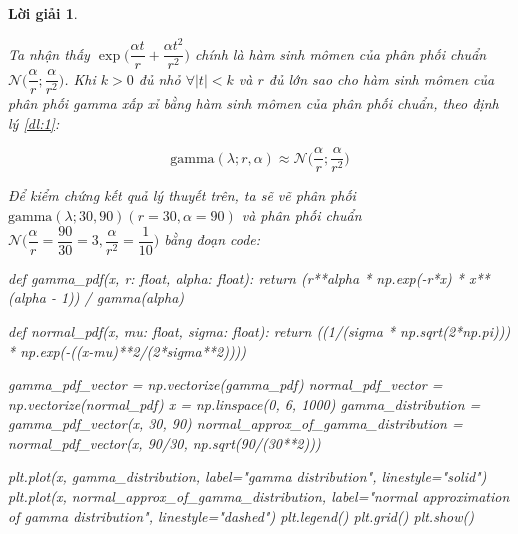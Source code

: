 \documentclass[14pt, a4paper]{article}
\theoremstyle{sltheorem}
\theoremstyle{soltheorem}
\newtheorem*{loigiai}{Lời giải}
\begin{document}
\begin{loigiai}
\begin{enumerate}
        Ta nhận thấy $\exp\Bigg( \dfrac{\alpha t}{r} + \dfrac{\alpha t^2}{r^2}\Bigg)$ chính là hàm sinh mômen của phân phối chuẩn $\mathcal{N}\Big(\dfrac{\alpha}{r}; \dfrac{\alpha}{r^2} \Big)$.
        Khi $k > 0$ đủ nhỏ $\forall \lvert t \rvert <k$ và $r$ đủ lớn sao cho hàm sinh mômen của phân phối gamma xấp xỉ bằng hàm sinh mômen của phân phối chuẩn, theo định lý \ref{dl:1}:

        \begin{equation*}
            \text{gamma}(\lambda; r, \alpha) \approx \mathcal{N}\Big(\dfrac{\alpha}{r};\dfrac{\alpha}{r^2}\Big)
        \end{equation*}

        Để kiểm chứng kết quả lý thuyết trên, ta sẽ vẽ phân phối $\text{gamma}(\lambda; 30, 90) (r=30, \alpha=90)$ và phân phối chuẩn $\mathcal{N}\Big(\dfrac{\alpha}{r}=\dfrac{90}{30}=3, \dfrac{\alpha}{r^2}=\dfrac{1}{10}\Big)$ bằng đoạn code:

        \begin{python}
def gamma_pdf(x, r: float, alpha: float):
    return (r**alpha * np.exp(-r*x) * x**(alpha - 1)) / gamma(alpha)


def normal_pdf(x, mu: float, sigma: float):
    return ((1/(sigma * np.sqrt(2*np.pi))) * np.exp(-((x-mu)**2/(2*sigma**2))))

gamma_pdf_vector = np.vectorize(gamma_pdf)
normal_pdf_vector = np.vectorize(normal_pdf)
x = np.linspace(0, 6, 1000)
gamma_distribution = gamma_pdf_vector(x, 30, 90)
normal_approx_of_gamma_distribution = normal_pdf_vector(x, 90/30, np.sqrt(90/(30**2)))
            
plt.plot(x, gamma_distribution, label="gamma distribution", linestyle="solid")
plt.plot(x, normal_approx_of_gamma_distribution, label="normal approximation of gamma distribution", linestyle="dashed")
plt.legend()
plt.grid()
plt.show()
        \end{python}


\end{enumerate}
\end{loigiai}
\end{document}

